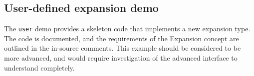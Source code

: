 \subsection{User-defined expansion demo}

The {\tt user} demo provides a skeleton code that implements a new
expansion type. The code is documented, and the requirements of the
Expansion concept are outlined in the in-source comments. This example
should be considered to be more advanced, and would require
investigation of the advanced interface to understand completely.
